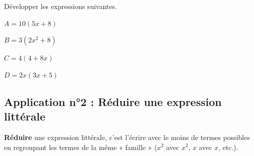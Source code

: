 \documentclass[a4paper]{book}
\begin{document}
    
    \begin{exemple}
        Développer les expressions suivantes.

        \medskip
        
        \begin{minipage}[t]{0.24\textwidth}
            $A = 10(5x + 8)$ \\

            \vspace{1.5cm}
        \end{minipage}
        \hfill \vline \hfill
        \begin{minipage}[t]{0.24\textwidth}
            $B = 3(2x^2 + 8)$ \\

            \vspace{1.5cm}
        \end{minipage}
        \hfill \vline \hfill
        \begin{minipage}[t]{0.24\textwidth}
            $C = 4(4 + 8x)$ \\

            \vspace{1.5cm}
        \end{minipage}
        \hfill \vline \hfill
        \begin{minipage}[t]{0.24\textwidth}
            $D = 2x(3x + 5)$ \\

            \vspace{1.5cm}
        \end{minipage}
        \vspace{0.5cm}
    \end{exemple}


\subsection{Application n°2 : Réduire une expression littérale}

    \begin{definition}
        \textbf{Réduire} une expression littérale, c'est l'écrire avec le moins de termes possibles en regroupant les termes de la même « famille » ($x^2$ avec $x^2$, $x$ avec $x$, etc.).
    \end{definition}
\end{document}
